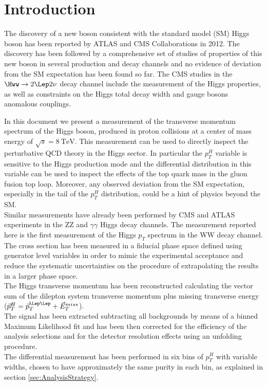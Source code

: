 \section{Introduction}
\label{sec:Introduction}
The discovery of a new boson consistent with the standard model (SM) Higgs boson has been reported by ATLAS and CMS Collaborations in 2012.
The discovery has been followed by a comprehensive set of studies of properties of this new boson in several production and decay channels and no evidence of deviation from the SM expectation has been found so far. The CMS studies in the $\Hww\to2\Lep2\nu$ decay channel include the measurement of the Higgs properties, as well as constraints on the Higgs total decay width and gauge bosons anomalous couplings.

In this document we present a measurement of the transverse momentum spectrum of the Higgs boson, produced in proton collisions at a center of mass energy of $\sqrt{s}=8~\mathrm{TeV}$.
This measurement can be used to directly inspect the perturbative QCD theory in the Higgs sector.
In particular the $p_T^H$ variable is sensitive to the Higgs production mode and the differential distribution in this variable can be used to inspect the effects of the top quark mass in the gluon fusion top loop. Moreover, any observed deviation from the SM expectation, especially in the tail of the $p_T^H$ distribution, could be a hint of physics beyond the SM.\\
Similar measurements have already been performed by CMS and ATLAS experiments in the ZZ and $\gamma\gamma$ Higgs decay channels.
The measurement reported here is the first measurement of the Higgs $p_T$ spectrum in the WW decay channel.\\
The cross section has been measured in a fiducial phase space defined using generator level variables in order to mimic the experimental acceptance and reduce the systematic uncertainties on the procedure of extrapolating the results in a larger phase space.\\
The Higgs transverse momentum has been reconstructed calculating the vector sum of the dilepton system transverse momentum plus missing transverse energy ($\vec{p}_T^H = \vec{p}_T^{\Lep\Lep} + \vec{E}_T^{miss}$).\\
The signal has been extracted subtracting all backgrounds by means of a binned Maximum Likelihood fit and has been then corrected for the efficiency of the analysis selections and for the detector resolution effects using an unfolding procedure.\\
The differential measurement has been performed in six bins of $p_T^H$ with variable widths, chosen to have approximately the same purity in each bin, as explained in section \ref{sec:AnalysisStrategy}.\\



